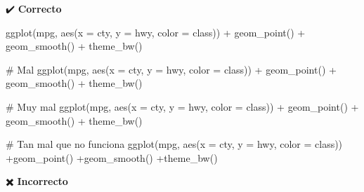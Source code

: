 \documentclass[
  spanish,
  letterpaper,
  DIV=11,
  numbers=noendperiod]{scrreprt}
\newenvironment{Shaded}{\begin{snugshade}}{\end{snugshade}}
\newcommand{\AttributeTok}[1]{\textcolor[rgb]{0.40,0.45,0.13}{#1}}
\newcommand{\CommentTok}[1]{\textcolor[rgb]{0.37,0.37,0.37}{#1}}
\newcommand{\FunctionTok}[1]{\textcolor[rgb]{0.28,0.35,0.67}{#1}}
\newcommand{\NormalTok}[1]{\textcolor[rgb]{0.00,0.23,0.31}{#1}}
\newcommand{\SpecialCharTok}[1]{\textcolor[rgb]{0.37,0.37,0.37}{#1}}
\begin{document}
✔️ \textbf{Correcto}

\begin{Shaded}
\begin{Highlighting}[]
\FunctionTok{ggplot}\NormalTok{(mpg, }\FunctionTok{aes}\NormalTok{(}\AttributeTok{x =}\NormalTok{ cty, }\AttributeTok{y =}\NormalTok{ hwy, }\AttributeTok{color =}\NormalTok{ class)) }\SpecialCharTok{+}
  \FunctionTok{geom\_point}\NormalTok{() }\SpecialCharTok{+}
  \FunctionTok{geom\_smooth}\NormalTok{() }\SpecialCharTok{+}
  \FunctionTok{theme\_bw}\NormalTok{()}

\CommentTok{\# Mal}
\FunctionTok{ggplot}\NormalTok{(mpg, }\FunctionTok{aes}\NormalTok{(}\AttributeTok{x =}\NormalTok{ cty, }\AttributeTok{y =}\NormalTok{ hwy, }\AttributeTok{color =}\NormalTok{ class)) }\SpecialCharTok{+}
  \FunctionTok{geom\_point}\NormalTok{() }\SpecialCharTok{+}
  \FunctionTok{geom\_smooth}\NormalTok{() }\SpecialCharTok{+}
  \FunctionTok{theme\_bw}\NormalTok{()}

\CommentTok{\# Muy mal}
\FunctionTok{ggplot}\NormalTok{(mpg, }\FunctionTok{aes}\NormalTok{(}\AttributeTok{x =}\NormalTok{ cty, }\AttributeTok{y =}\NormalTok{ hwy, }\AttributeTok{color =}\NormalTok{ class)) }\SpecialCharTok{+}
  \FunctionTok{geom\_point}\NormalTok{() }\SpecialCharTok{+}
  \FunctionTok{geom\_smooth}\NormalTok{() }\SpecialCharTok{+}
  \FunctionTok{theme\_bw}\NormalTok{()}

\CommentTok{\# Tan mal que no funciona}
\FunctionTok{ggplot}\NormalTok{(mpg, }\FunctionTok{aes}\NormalTok{(}\AttributeTok{x =}\NormalTok{ cty, }\AttributeTok{y =}\NormalTok{ hwy, }\AttributeTok{color =}\NormalTok{ class))}
\SpecialCharTok{+}\FunctionTok{geom\_point}\NormalTok{()}
\SpecialCharTok{+}\FunctionTok{geom\_smooth}\NormalTok{()}
\SpecialCharTok{+}\FunctionTok{theme\_bw}\NormalTok{()}
\end{Highlighting}
\end{Shaded}

✖️ \textbf{Incorrecto}
\end{document}
